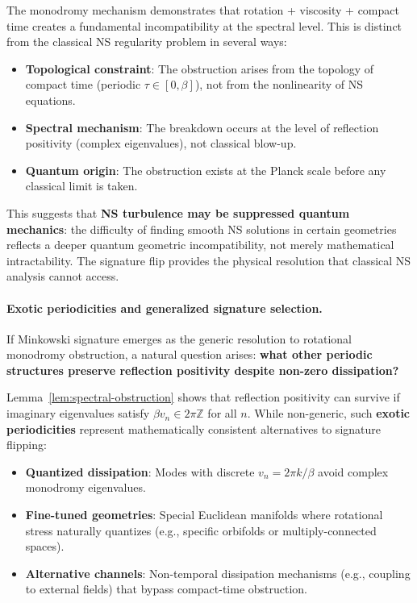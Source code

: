 \documentclass[11pt]{article}
\begin{document}
The monodromy mechanism demonstrates that rotation + viscosity + compact time creates 
a fundamental incompatibility at the spectral level. This is distinct from the 
classical NS regularity problem in several ways:

\begin{itemize}
\item \textbf{Topological constraint}: The obstruction arises from the topology of 
compact time (periodic $\tau \in [0,\beta]$), not from the nonlinearity of NS equations.

\item \textbf{Spectral mechanism}: The breakdown occurs at the level of reflection 
positivity (complex eigenvalues), not classical blow-up.

\item \textbf{Quantum origin}: The obstruction exists at the Planck scale before 
any classical limit is taken.
\end{itemize}

This suggests that \textbf{NS turbulence may be suppressed quantum mechanics}: the 
difficulty of finding smooth NS solutions in certain geometries reflects a deeper 
quantum geometric incompatibility, not merely mathematical intractability. The 
signature flip provides the physical resolution that classical NS analysis cannot access.

\paragraph{Exotic periodicities and generalized signature selection.}
If Minkowski signature emerges as the generic resolution to rotational monodromy 
obstruction, a natural question arises: \textbf{what other periodic structures 
preserve reflection positivity despite non-zero dissipation?}

Lemma~\ref{lem:spectral-obstruction} shows that reflection positivity can survive 
if imaginary eigenvalues satisfy $\beta v_n \in 2\pi\mathbb{Z}$ for all $n$. While 
non-generic, such \textbf{exotic periodicities} represent mathematically consistent 
alternatives to signature flipping:

\begin{itemize}
\item \textbf{Quantized dissipation}: Modes with discrete $v_n = 2\pi k/\beta$ avoid 
complex monodromy eigenvalues.

\item \textbf{Fine-tuned geometries}: Special Euclidean manifolds where rotational 
stress naturally quantizes (e.g., specific orbifolds or multiply-connected spaces).

\item \textbf{Alternative channels}: Non-temporal dissipation mechanisms (e.g., 
coupling to external fields) that bypass compact-time obstruction.
\end{itemize}
\end{document}
